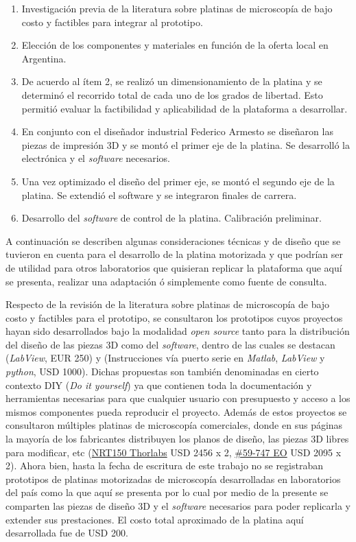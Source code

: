 \begin{enumerate}
\item Investigación previa de la literatura sobre platinas de microscopía de bajo costo y factibles para integrar al prototipo.
\item Elección de los componentes y materiales en función de la oferta local en Argentina.
\item De acuerdo al ítem 2, se realizó un dimensionamiento de la platina y se determinó el recorrido total de cada uno de los grados de libertad. Esto permitió evaluar la factibilidad y aplicabilidad de la plataforma a desarrollar.
\item En conjunto con el diseñador industrial Federico Armesto se diseñaron las piezas de impresión 3D y se montó el primer eje de la platina. Se desarrolló la electrónica y el \textit{software} necesarios.
\item Una vez optimizado el diseño del primer eje, se montó el segundo eje de la platina. Se extendió el software y se integraron finales de carrera.
\item Desarrollo del \textit{software} de control de la platina. Calibración preliminar.
\end{enumerate}

A continuación se describen algunas consideraciones técnicas y de diseño que se tuvieron en cuenta para el desarrollo de la platina motorizada y que podrían ser de utilidad para otros laboratorios que quisieran replicar la plataforma que aquí se presenta, realizar una adaptación ó simplemente como fuente de consulta.

Respecto de la revisión de la literatura sobre platinas de microscopía de bajo costo y factibles para el prototipo, se consultaron  los prototipos cuyos proyectos hayan sido desarrollados bajo la modalidad \textit{open source} tanto para la distribución del diseño de las piezas 3D como del \textit{software}, dentro de las cuales se destacan \cite{schaa}(\textit{LabView}, EUR 250) y \cite{campbells}(Instrucciones vía puerto serie en \textit{Matlab}, \textit{LabView} y \textit{python}, USD 1000). Dichas propuestas son también denominadas en cierto contexto DIY (\textit{Do it yourself}) ya que contienen toda la documentación y herramientas necesarias para que cualquier usuario con presupuesto y acceso a los mismos componentes pueda reproducir el proyecto. Además de estos proyectos se consultaron múltiples platinas de microscopía comerciales, donde en sus páginas la mayoría de los fabricantes distribuyen los planos de diseño, las piezas 3D libres para modificar, etc (\href{https://www.thorlabs.com/newgrouppage9.cfm?objectgroup\_id=2132}{NRT150 Thorlabs} USD 2456 x 2, \href{https://www.edmundoptics.com/p/150mm-motorized-stage/16419/}{\#59-747 EO} USD 2095 x 2). Ahora bien, hasta la fecha de escritura de este trabajo no se registraban prototipos de platinas motorizadas de microscopía desarrolladas en laboratorios del país como la que aquí se presenta por lo cual por medio de la presente se comparten las piezas de diseño 3D y el \textit{software} necesarios para poder replicarla y extender sus prestaciones. El costo total aproximado de la platina aquí desarrollada fue de USD 200.

